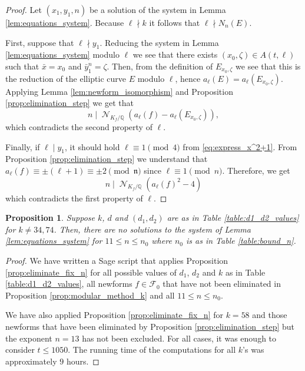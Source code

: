 \documentclass[12pt]{amsart}
\numberwithin{equation}{section}
\newtheorem{proposition}[lemma]{Proposition}
\theoremstyle{definition}
\theoremstyle{remark}
\newcommand{\QQ}{\mathbb{Q}}
\newcommand{\fn}{\mathfrak{n}}
\DeclareMathOperator{\Norm}{\mathcal{N}}
\begin{document}
\begin{proof}
Let $(x_1,y_1,n)$ be a solution of the system in Lemma \ref{lem:equations_system}. Because $\ell\nmid k$ it follows that $\ell\nmid N_n(E)$. 

First, suppose that $\ell\nmid y_1$. Reducing the system in Lemma \ref{lem:equations_system} modulo $\ell$ we see that there exists $(x_0, \zeta)\in A(t,\ell)$ such that $\bar{x}= x_0$ and $\bar{y}_1^n= \zeta$. Then, from the definition of $E_{x_0,\zeta}$ we see that this is the reduction
of the elliptic curve $E$ modulo $\ell$, hence $a_{\ell}(E)=a_{\ell}(E_{x_0,\zeta})$. 
Applying Lemma \ref{lem:newform_isomorphism} and 
Proposition \ref{prop:elimination_step} 
we get that 
\begin{equation*}
n\mid \Norm_{K_f/\QQ}(a_\ell(f) - a_{\ell}(E_{x_0,\zeta})),
\end{equation*}
which contradicts the second property of $\ell$.

Finally, if $\ell\mid y_1$, it should hold $\ell\equiv 1\pmod{4}$ from \eqref{eq:express_x^2+1}. From Proposition \ref{prop:elimination_step} we understand that $a_{\ell}(f)\equiv \pm (\ell + 1)\equiv \pm 2\pmod{\fn}$ since $\ell\equiv 1\pmod{n}$. Therefore, we get 
\begin{equation*}
n\mid \Norm_{K_{f}/\QQ}(a_{\ell}(f)^2 - 4) 
\end{equation*}
which contradicts the first property of $\ell$.
\end{proof}


\begin{proposition}\label{prop:no_solutions_in_range}
Suppose $k$, $d$ and $(d_1,d_2)$ are as in Table \ref{table:d1_d2_values} for $k\neq 34, 74$. Then, there are no solutions to the system of Lemma \ref{lem:equations_system} for $11\leq n\leq n_0$ where $n_0$ is as in Table \ref{table:bound_n}.
\end{proposition}

\begin{proof}
We have written a Sage script that applies Proposition \ref{prop:eliminate_fix_n} for all possible values of $d_1$, $d_2$ and $k$ as in Table \ref{table:d1_d2_values}, all newforms $f\in\mathcal{F}_0$ that have not been eliminated in Proposition \ref{prop:modular_method_k} and all $11\leq n \leq n_0$.

We have also applied Proposition \ref{prop:eliminate_fix_n} for $k=58$ and those newforms that have been eliminated by Proposition \ref{prop:elimination_step} but the exponent $n=13$ has not been excluded. For all cases, it was enough to consider $t\leq 1050$. The running time of the computations for all $k$'s was approximately $9$ hours.
\end{proof}
\end{document}
